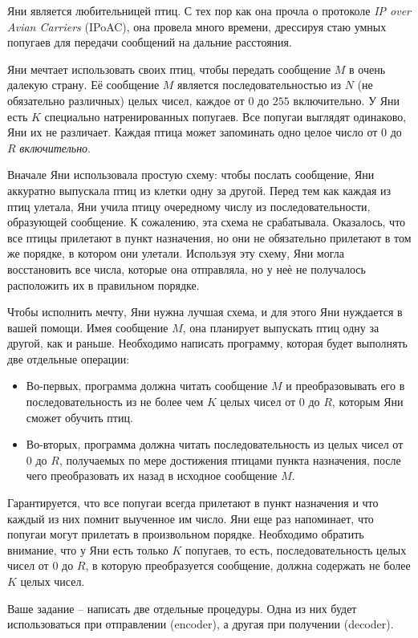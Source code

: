 Яни является любительницей птиц. С тех пор как она прочла о протоколе \textit{IP over Avian Carriers} (IPoAC), она провела много времени, дрессируя стаю умных попугаев для передачи сообщений на дальние расстояния.

Яни мечтает использовать своих птиц, чтобы передать сообщение $M$ в очень далекую страну. Её сообщение $M$ является последовательностью из $N$ (не обязательно различных) целых
чисел, каждое от $0$ до $255$ включительно. У Яни есть $K$ специально натренированных
попугаев. Все попугаи выглядят одинаково, Яни их не различает. Каждая птица может
запоминать одно целое число от $0$ до $R$ \textit{включительно}.

Вначале Яни использовала простую схему: чтобы послать сообщение, Яни аккуратно
выпускала птиц из клетки одну за другой. Перед тем как каждая из птиц улетала, Яни учила
птицу очередному числу из последовательности, образующей сообщение. К сожалению, эта
схема не срабатывала. Оказалось, что все птицы прилетают в пункт назначения, но они не
обязательно прилетают в том же порядке, в котором они улетали. Используя эту схему, Яни
могла восстановить все числа, которые она отправляла, но у неѐ не получалось расположить
их в правильном порядке.

Чтобы исполнить мечту, Яни нужна лучшая схема, и для этого Яни нуждается в вашей
помощи. Имея сообщение $M$, она планирует выпускать птиц одну за другой, как и раньше.
Необходимо написать программу, которая будет выполнять две отдельные операции:
\begin{itemize}
\item Во-первых, программа должна читать сообщение $M$ и преобразовывать его в
последовательность из не более чем $K$ целых чисел от $0$ до $R$, которым Яни сможет
обучить птиц.
\item Во-вторых, программа должна читать последовательность из целых чисел от $0$ до $R$,
получаемых по мере достижения птицами пункта назначения, после чего
преобразовать их назад в исходное сообщение $M$.
\end{itemize}
Гарантируется, что все попугаи всегда прилетают в пункт назначения и что каждый из них
помнит выученное им число. Яни еще раз напоминает, что попугаи могут прилетать в
произвольном порядке. Необходимо обратить внимание, что у Яни есть только $K$ попугаев, то
есть, последовательность целых чисел от $0$ до $R$, в которую преобразуется сообщение,
должна содержать не более $K$ целых чисел.

Ваше задание -- написать две отдельные процедуры. Одна из них будет использоваться при отправлении (encoder), а другая при получении (decoder).

